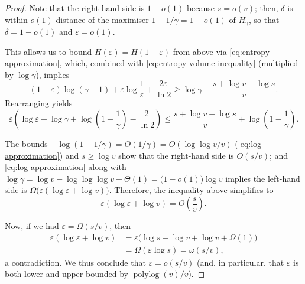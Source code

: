 \documentclass[10pt,a4paper]{article}
\theoremstyle{definition}
\newcommand{\polylog}{\operatorname{polylog}}
\newcommand{\eps}{\varepsilon}
\newcommand{\vcommitlength}{v}
\newcommand{\alphabetsize}{\gamma}
\begin{document}
\begin{proof}
    Note that the right-hand side is $1 - o(1)$ because $s = o(\vcommitlength)$; then, $\delta$ is within $o(1)$ distance of the maximiser $1 - 1/\alphabetsize = 1 - o(1)$ of $H_\alphabetsize$, so that $\delta = 1 - o(1)$ and $\eps = o(1)$.
    
    This allows us to bound $H(\eps) = H(1 - \eps)$ from above via \cref{eq:entropy-approximation}, which, combined with \cref{eq:entropy-volume-inequality} (multiplied by $\log \alphabetsize$), implies
    \begin{equation*}
        (1 - \eps) \log(\alphabetsize - 1) + \eps \log \frac1{\eps} + \frac{2 \eps}{\ln 2} \geq \log \alphabetsize - \frac{s + \log \vcommitlength - \log s}{\vcommitlength}.
    \end{equation*}
    Rearranging yields
    \begin{equation*}
        \eps \left(\log \eps + \log \alphabetsize + \log \left(1 - \frac1{\alphabetsize}\right) - \frac{2}{\ln 2}\right) \leq  \frac{s + \log \vcommitlength - \log s}{\vcommitlength} + \log \left(1 - \frac1{\alphabetsize}\right).
    \end{equation*}

    The bounds $-\log(1-1/\alphabetsize) = O(1/\alphabetsize) = O(\log\log \vcommitlength / \vcommitlength)$ (\cref{eq:log-approximation}) and $s \geq \log \vcommitlength$ show that the right-hand side is $O(s/\vcommitlength)$; and \cref{eq:log-approximation} along with $\log \alphabetsize = \log \vcommitlength - \log\log\log \vcommitlength + \Theta(1) = \big(1 - o(1)\big)\log \vcommitlength$ implies the left-hand side is $\Omega\big(\eps (\log \eps + \log \vcommitlength)\big)$. Therefore, the inequality above simplifies to
    \begin{equation*}
        \eps (\log \eps + \log \vcommitlength) = O\left(\frac{s}{\vcommitlength}\right).
    \end{equation*}

    Now, if we had $\eps = \Omega(s/\vcommitlength)$, then
    \begin{align*}
        \eps (\log \eps + \log \vcommitlength) &= \eps \big(\log s - \log \vcommitlength + \log \vcommitlength + \Omega(1)\big)\\
        &= \Omega(\eps \log s) = \omega(s/\vcommitlength),
    \end{align*}
    a contradiction. We thus conclude that $\eps = o(s/\vcommitlength)$ (and, in particular, that $\eps$ is both lower and upper bounded by $\polylog(\vcommitlength)/\vcommitlength$).


\end{proof}
\end{document}
